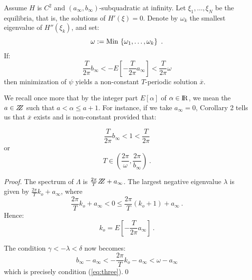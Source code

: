 \documentclass{svproc}
\begin{document}
%
\begin{corollary}
Assume $H$ is $C^{2}$ and
$\left(a_{\infty},b_{\infty}\right)$-subquadratic at infinity. Let
$\xi_{1},\allowbreak\dots,\allowbreak\xi_{N}$  be the
equilibria, that is, the solutions of $H' (\xi ) = 0$.
Denote by $\omega_{k}$
the smallest eigenvalue of $H'' \left(\xi_{k}\right)$, and set:
\begin{equation}
  \omega : = {\rm Min\,} \left\{\omega_{1},\dots,\omega_{k}\right\}\ .
\end{equation}
If:
\begin{equation}
  \frac{T}{2\pi} b_{\infty} <
  - E \left[- \frac{T}{2\pi}a_{\infty}\right] <
  \frac{T}{2\pi}\omega
  \label{eq:three}
\end{equation}
then minimization of $\psi$ yields a non-constant $T$-periodic solution
$\overline{x}$.
\end{corollary}
%

We recall once more that by the integer part $E [\alpha ]$ of
$\alpha \in {\rm I\!R}$, we mean the $a\in \bbbz$
such that $a< \alpha \le a+1$. For instance,
if we take $a_{\infty} = 0$, Corollary 2 tells
us that $\overline{x}$ exists and is
non-constant provided that:

\begin{equation}
  \frac{T}{2\pi} b_{\infty} < 1 < \frac{T}{2\pi}
\end{equation}
or
\begin{equation}
  T\in \left(\frac{2\pi}{\omega},\frac{2\pi}{b_{\infty}}\right)\ .
  \label{eq:four}
\end{equation}

%
\begin{proof}
The spectrum of $\Lambda$ is $\frac{2\pi}{T} \bbbz +a_{\infty}$. The
largest negative eigenvalue $\lambda$ is given by
$\frac{2\pi}{T}k_{o} +a_{\infty}$,
where
\begin{equation}
  \frac{2\pi}{T}k_{o} + a_{\infty} < 0
  \le \frac{2\pi}{T} (k_{o} +1) + a_{\infty}\ .
\end{equation}
Hence:
\begin{equation}
  k_{o} = E \left[- \frac{T}{2\pi} a_{\infty}\right] \ .
\end{equation}

The condition $\gamma < -\lambda < \delta$ now becomes:
\begin{equation}
  b_{\infty} - a_{\infty} <
  - \frac{2\pi}{T} k_{o} -a_{\infty} < \omega -a_{\infty}
\end{equation}
which is precisely condition (\ref{eq:three}).\qed
\end{proof}
%
\end{document}
